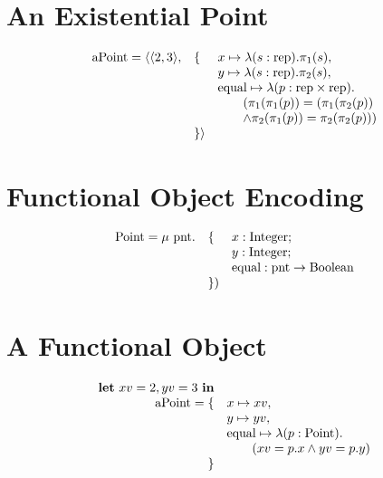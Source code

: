\documentclass[12pt]{amsart}
\begin{document}
\section*{An Existential Point}
\[
\begin{array}{lll}
\textrm{aPoint} = \langle\langle 2, 3 \rangle, &\{& x \mapsto \lambda(s : \textrm{rep}).\pi_1(s),\\
&& y \mapsto \lambda(s : \textrm{rep}).\pi_2(s),\\
&&\textrm{equal} \mapsto \lambda(p : \textrm{rep} \times \textrm{rep}). \\
&& \qquad (\pi_1(\pi_1(p)) = (\pi_1(\pi_2(p)) \\
&& \qquad \wedge \pi_2(\pi_1(p)) = \pi_2(\pi_2(p))) \\
&\}\rangle
\end{array}
\]
\newpage
\section*{Functional Object Encoding}
\newcommand{\pnt}{\textrm{pnt}}
\[
\begin{array}{lll}
\Point = \mu ~ \pnt . & \{ & x : \Integer; \\
&& y : \Integer; \\
&& \textrm{equal} : \pnt \rightarrow \Boolean\\
&\})
\end{array}
\]
\newpage
\section*{A Functional Object}
\[
\begin{array}{rl}
\textbf{let}~xv = 2, yv = 3~\textbf{in} \\
\textrm{aPoint} =  \{& x \mapsto xv,\\
& y \mapsto yv,\\
&\textrm{equal} \mapsto \lambda(p : \textrm{Point}). \\
& \qquad (xv = p.x \wedge yv = p.y) \\
\}
\end{array}
\]
\newpage
\end{document}
